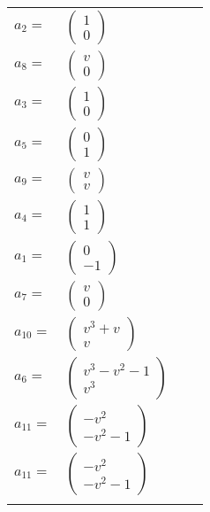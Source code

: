 \documentclass[1p]{elsarticle_modified}
\theoremstyle{definition}
\begin{document}
\begin{tabular}{m{7pt} m{180pt} m{7pt} m{180pt} }
\flushright $a_{2}=$&$\begin{pmatrix}1\\0\end{pmatrix}$ \\
\flushright $a_{8}=$&$\begin{pmatrix}v\\0\end{pmatrix}$ \\
\flushright $a_{3}=$&$\begin{pmatrix}1\\0\end{pmatrix}$ \\
\flushright $a_{5}=$&$\begin{pmatrix}0\\1\end{pmatrix}$ \\
\flushright $a_{9}=$&$\begin{pmatrix}v\\v\end{pmatrix}$ \\
\flushright $a_{4}=$&$\begin{pmatrix}1\\1\end{pmatrix}$ \\
\flushright $a_{1}=$&$\begin{pmatrix}0\\-1\end{pmatrix}$ \\
\flushright $a_{7}=$&$\begin{pmatrix}v\\0\end{pmatrix}$ \\
\flushright $a_{10}=$&$\begin{pmatrix}v^3+v\\v\end{pmatrix}$ \\
\flushright $a_{6}=$&$\begin{pmatrix}v^3- v^2-1\\v^3\end{pmatrix}$ \\
\flushright $a_{11}=$&$\begin{pmatrix}- v^2\\- v^2-1\end{pmatrix}$\\ \flushright $a_{11}=$&$\begin{pmatrix}- v^2\\- v^2-1\end{pmatrix}$\\&\end{tabular}
\end{document}
